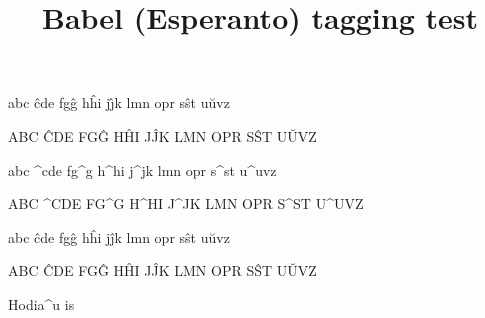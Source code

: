 \documentclass{article}
\title{Babel (Esperanto) tagging test}
\begin{document}
  
abc \^{c}de fg\^{g} h\^{h}i j\^{\j}k lmn opr s\^{s}t u\u{u}vz

ABC \^{C}DE FG\^{G} H\^{H}I J\^{J}K LMN OPR S\^{S}T U\u{U}VZ

abc ^cde fg^g h^hi j^jk lmn opr s^st u^uvz

ABC ^CDE FG^G H^HI J^JK LMN OPR S^ST U^UVZ

abc ĉde fgĝ hĥi jĵk lmn opr sŝt uŭvz

ABC ĈDE FGĜ HĤI JĴK LMN OPR SŜT UŬVZ

Hodia^u is \hodiau
\end{document}
